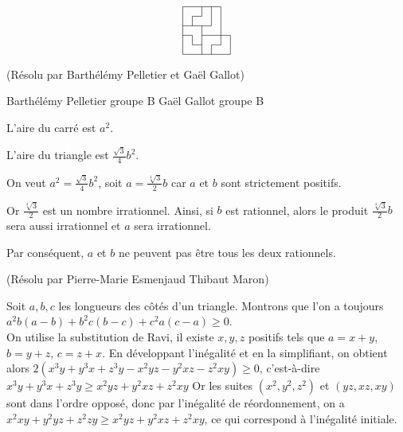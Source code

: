 \begin{sol}[34]
\[\begin{tikzpicture}[scale=0.3]
\draw (0, 0)--(0,5 );
\draw (1, 1)--(1,2 );
\draw (1, 3)--(1,4 );
\draw (2, 0)--(2,3 );
\draw (2, 4)--(2,5 );
\draw (3, 0)--(3,1 );
\draw (3, 3)--(3,5 );
\draw (4, 1)--(4,5 );
\draw (5, 0)--(5,2 );

\draw(0,0)--(5,0);
\draw(1,1)--(2,1);
\draw(3,1)--(4,1);
\draw(0,2)--(1,2);
\draw(2,2)--(5,2);
\draw(0,3)--(3,3);
\draw(1,4)--(2,4);
\draw(0,5)--(4,5);
\end{tikzpicture}\]

\end{sol}

\begin{sol}[56](Résolu par Barthélémy Pelletier et Gaël Gallot)

Barthélémy Pelletier groupe B
Gaël Gallot groupe B

L'aire du carré est $a^2$.

L'aire du triangle est $\frac{\sqrt{3}}{4}b^2$.

On veut $a^2=\frac{\sqrt{3}}{4}b^2$, soit $a=\frac{\sqrt[4]{3}}{2}b$ car $a$ et $b$ sont strictement positifs.

Or $\frac{\sqrt[4]{3}}{2}$ est un nombre irrationnel.
Ainsi, si $b$ est rationnel, alors le produit $\frac{\sqrt[4]{3}}{2}b$ sera aussi irrationnel et $a$ sera irrationnel.

Par conséquent, $a$ et $b$ ne peuvent pas être tous les deux rationnels.

\end{sol}


\begin{sol}[130](Résolu par Pierre-Marie Esmenjaud Thibaut Maron)

Soit $a,b,c$ les longueurs des côtés d'un triangle. Montrons que l'on a toujours $a^2b(a-b)+b^2c(b-c)+c^2a(c-a) \geq 0$.\\
On utilise la substitution de Ravi, il existe $x,y,z$ positifs tels que 
$a=x+y$,$b=y+z$, $c=z+x$.
En développant l'inégalité et en la simplifiant, on obtient alors
$2(x^3y+y^3x+z^3y-x^2yz-y^2xz-z^2xy) \geq 0$,
c'est-\`a-dire $x^3y+y^3x+z^3y \geq x^2yz+y^2xz+z^2xy$
Or les suites $(x^2,y^2,z^2)$ et $(yz,xz,xy)$ sont dans l'ordre opposé, donc par l'in\'egalit\'e de r\'eordonnement,
on a $x^2xy+y^2yz+z^2zy \geq x^2yz+y^2xz+z^2xy$, ce qui correspond \`a l'in\'egalit\'e initiale.

\end{sol}

